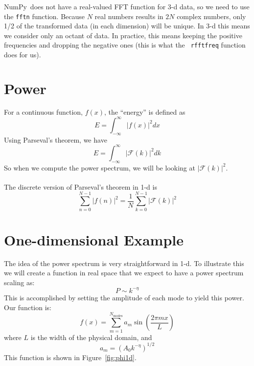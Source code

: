 \documentclass[11pt]{article}
\newcommand{\numpy}{{\sffamily NumPy}}
\begin{document}
\numpy\ does not have a real-valued FFT function for 3-d data, so we
need to use the {\tt fftn} function.  Because $N$ real numbers results
in $2N$ complex numbers, only 1/2 of the transformed data (in each
dimension) will be unique.  In 3-d this means we consider only an
octant of data.  In practice, this means keeping the positive
frequencies and dropping the negative ones (this is what the {\tt
  rfftfreq} function does for us).




\section*{Power}

For a continuous function, $f(x)$, the ``energy'' is defined as
\begin{equation}
E = \int_{-\infty}^\infty |f(x)|^2 dx
\end{equation}
Using Parseval's theorem, we have
\begin{equation}
E = \int_{-\infty}^\infty |\mathcal{F}(k)|^2 dk
\end{equation}
%
So when we compute the power spectrum, we will be looking at
$|\mathcal{F}(k)|^2$. \\

 \\

The discrete version of Parseval's theorem in 1-d is
\begin{equation}
\sum_{n=0}^{N-1} | f(n) |^2 = \frac{1}{N} \sum_{k=0}^{N-1} | \mathcal{F}(k) |^2
\end{equation}


\section*{One-dimensional Example}

The idea of the power spectrum is very straightforward in 1-d.  To illustrate
this we will create a function in real space that we expect to have a
power spectrum scaling as:
\begin{equation}
P \sim k^{-\eta}
\end{equation}
This is accomplished by setting the amplitude of each mode to yield
this power.  Our function is:
\begin{equation}
f(x) = \sum_{m=1}^{N_\mathrm{modes}} a_m \sin \left ( \frac{2\pi m x}{L}\right )
\end{equation}
where $L$ is the width of the physical domain, and 
\begin{equation}
a_m = \left (A_0 k^{-\eta} \right )^{1/2}
\end{equation}
This function is shown in Figure~\ref{fig:phi1d}.
\end{document}
